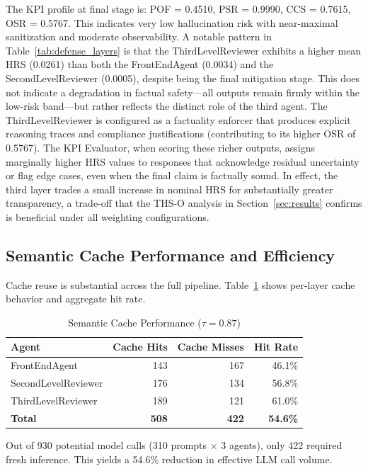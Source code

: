\documentclass[11pt,a4paper]{article}
\begin{document}
The KPI profile at final stage is: POF = 0.4510, PSR = 0.9990, CCS = 0.7615, OSR = 0.5767. This indicates very low hallucination risk with near-maximal sanitization and moderate observability.
A notable pattern in Table~\ref{tab:defense_layers} is that the ThirdLevelReviewer exhibits a higher mean HRS (0.0261) than both the FrontEndAgent (0.0034) and the SecondLevelReviewer (0.0005), despite being the final mitigation stage. This does not indicate a degradation in factual safety---all outputs remain firmly within the low-risk band---but rather reflects the distinct role of the third agent. The ThirdLevelReviewer is configured as a factuality enforcer that produces explicit reasoning traces and compliance justifications (contributing to its higher OSR of 0.5767). The KPI Evaluator, when scoring these richer outputs, assigns marginally higher HRS values to responses that acknowledge residual uncertainty or flag edge cases, even when the final claim is factually sound. In effect, the third layer trades a small increase in nominal HRS for substantially greater transparency, a trade-off that the THS-O analysis in Section~\ref{sec:results} confirms is beneficial under all weighting configurations.

\subsection{Semantic Cache Performance and Efficiency}

Cache reuse is substantial across the full pipeline. Table~\ref{tab:cache_performance} shows per-layer cache behavior and aggregate hit rate.

\begin{table}[!htbp]
\centering
\caption{Semantic Cache Performance ($\tau = 0.87$)}
\label{tab:cache_performance}
\begin{tabular}{lrrr}
\toprule
\textbf{Agent} & \textbf{Cache Hits} & \textbf{Cache Misses} & \textbf{Hit Rate} \\
\midrule
FrontEndAgent & 143 & 167 & 46.1\% \\
SecondLevelReviewer & 176 & 134 & 56.8\% \\
ThirdLevelReviewer & 189 & 121 & 61.0\% \\
\midrule
\textbf{Total} & \textbf{508} & \textbf{422} & \textbf{54.6\%} \\
\bottomrule
\end{tabular}
\end{table}

Out of 930 potential model calls (310 prompts $\times$ 3 agents), only 422 required fresh inference. This yields a 54.6\% reduction in effective LLM call volume.
\end{document}
